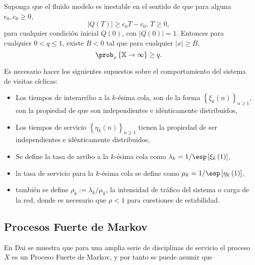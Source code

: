 \begin{Teo}\label{Tma2.2.Down}
Suponga que el fluido modelo es inestable en el sentido de que
para alguna $\epsilon_{0},c_{0}\geq0$,
\begin{equation}\label{Eq.Inestability}
|Q\left(T\right)|\geq\epsilon_{0}T-c_{0}\textrm{,   }T\geq0,
\end{equation}
para cualquier condici\'on inicial $Q\left(0\right)$, con
$|Q\left(0\right)|=1$. Entonces para cualquier $0<q\leq1$, existe
$B<0$ tal que para cualquier $|x|\geq B$,
\begin{equation}
\prob_{x}\left\{\mathbb{X}\rightarrow\infty\right\}\geq q.
\end{equation}
\end{Teo}



Es necesario hacer los siguientes supuestos sobre el
comportamiento del sistema de visitas c\'iclicas:
\begin{itemize}
\item Los tiempos de interarribo a la $k$-\'esima cola, son de la
forma $\left\{\xi_{k}\left(n\right)\right\}_{n\geq1}$, con la
propiedad de que son independientes e id{\'e}nticamente
distribuidos,
\item Los tiempos de servicio
$\left\{\eta_{k}\left(n\right)\right\}_{n\geq1}$ tienen la
propiedad de ser independientes e id{\'e}nticamente distribuidos,
\item Se define la tasa de arribo a la $k$-{\'e}sima cola como
$\lambda_{k}=1/\esp\left[\xi_{k}\left(1\right)\right]$,
\item la tasa de servicio para la $k$-{\'e}sima cola se define
como $\mu_{k}=1/\esp\left[\eta_{k}\left(1\right)\right]$,
\item tambi{\'e}n se define $\rho_{k}:=\lambda_{k}/\mu_{k}$, la
intensidad de tr\'afico del sistema o carga de la red, donde es
necesario que $\rho<1$ para cuestiones de estabilidad.
\end{itemize}



\subsection{Procesos Fuerte de Markov}
En Dai \cite{Dai} se muestra que para una amplia serie de disciplinas
de servicio el proceso $X$ es un Proceso Fuerte de
Markov, y por tanto se puede asumir que


